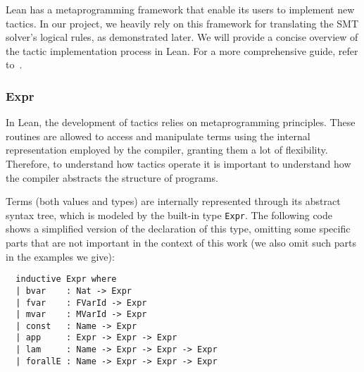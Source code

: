 Lean has a metaprogramming framework that enable its users to implement new tactics. In our project, we heavily rely on this framework for translating the SMT solver's logical rules, as demonstrated later. We will provide a concise overview of the tactic implementation process in Lean. For a more comprehensive guide, refer to~\cite{metaLean}.

\subsubsection{Expr}

In Lean, the development of tactics relies on metaprogramming principles. These routines are allowed to access and manipulate terms using the internal representation employed by the compiler, granting them a lot of flexibility. Therefore, to understand how tactics operate it is important to understand how the compiler abstracts the structure of programs.

Terms (both values and types) are internally represented through its abstract syntax tree, which is modeled by the built-in type \texttt{Expr}. The following code shows a simplified version of the declaration of this type, omitting some specific parts that are not important in the context of this work (we also omit such parts in the examples we give):

\begin{verbatim}
  inductive Expr where
  | bvar    : Nat -> Expr
  | fvar    : FVarId -> Expr
  | mvar    : MVarId -> Expr
  | const   : Name -> Expr
  | app     : Expr -> Expr -> Expr
  | lam     : Name -> Expr -> Expr -> Expr
  | forallE : Name -> Expr -> Expr -> Expr
\end{verbatim}

